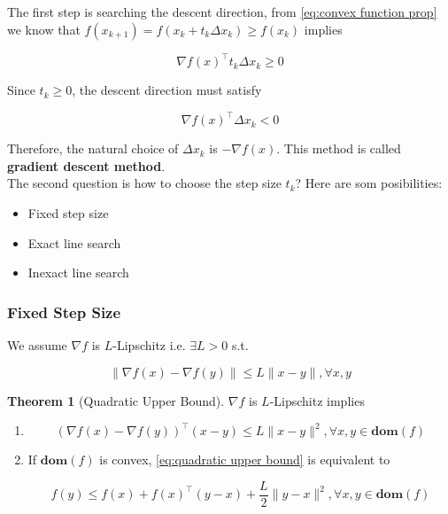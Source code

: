 \documentclass[12pt]{article} %
\theoremstyle{definition}
\newtheorem{theorem}{Theorem}
\begin{document}
\newpage

The first step is searching the descent direction, from \eqref{eq:convex function prop} we know that $f(x_{k + 1}) = f(x_k +  t_k \Delta x_k) \ge f(x_k)$ implies

$$
	\nabla f(x)^\intercal t_k \Delta x_k \ge 0 
$$

\noindent Since $t_k \ge 0$,  the descent direction must satisfy

$$
	\nabla f(x)^\intercal \Delta x_k < 0
$$

Therefore, the natural choice of $\Delta x_k$ is $-\nabla f(x)$. This method is called \textbf{gradient descent method}. \\

The second question is how to choose the step size $t_k$? Here are som posibilities:

\begin{itemize}
	\item Fixed step size
	
	\item Exact line search

	\item Inexact line search
\end{itemize}


\subsubsection*{Fixed Step Size}

 We assume $\nabla f$ is $L$-Lipschitz i.e. $\exists L > 0$ s.t.

$$
	\| \nabla f(x) - \nabla f(y) \| \le L \|x - y \|, \forall x, y
$$

\begin{theorem}[Quadratic Upper Bound]
	$\nabla f$ is $L$-Lipschitz  implies

	\begin{enumerate}
		\item 

		\begin{ceqn}
			\begin{equation}
				(\nabla f(x) - \nabla f(y))^\intercal (x - y) \le L \| x - y \|^2, \forall x, y \in \mathbf{dom}(f)
				\label{eq:quadratic upper bound}
			\end{equation}
		\end{ceqn}
		
		\item If $\mathbf{dom}(f)$ is convex, \eqref{eq:quadratic upper bound} is equivalent to

		$$
			f(y) \le f(x) + f(x)^\intercal (y - x) + \frac{L}{2} \| y - x \|^2, \forall x, y \in \mathbf{dom}(f)
		$$
	\end{enumerate}
\end{theorem}
\end{document}
